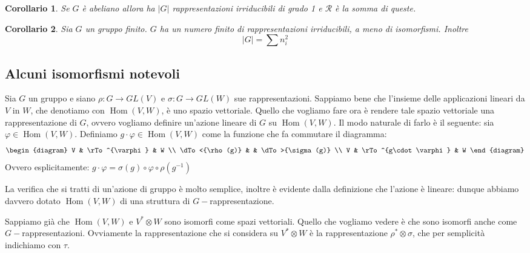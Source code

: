 \documentclass[11pt]{article}
\theoremstyle{plain}
\newtheorem*{cor}{Corollario}
\theoremstyle{definition}
\theoremstyle{remark}
\newcommand{\dsum}{\displaystyle\sum}
\DeclareMathOperator{\Hom}{Hom}
\newcommand{\quaddiag}[8]{
	\begin{diagram}
	#1     & \rTo^{#2} & #3 \\
	\dTo<{#6} &         & \dTo>{#4} \\
	#7     & \rTo^{#8} & #5
	\end{diagram}
}
\begin{document}
\begin{cor}
Se $G$ è abeliano allora ha $|G|$ rappresentazioni irriducibili di grado 1 e $\mathcal{R}$ è la somma di queste.
\end{cor}


\begin{cor}
Sia $G$ un gruppo finito. $G$ ha un numero finito di rappresentazioni irriducibili, a meno di isomorfismi. Inoltre
\[|G| = \dsum n_i^2\]
\end{cor}






\newpage
\subsection{Alcuni isomorfismi notevoli}
Sia $G$ un gruppo e siano $\rho:G\to GL(V)$ e $\sigma:G\to GL(W)$ sue rappresentazioni.
Sappiamo bene che l'insieme delle applicazioni lineari da $V$ in $W$,
che denotiamo con $\Hom(V, W)$, è uno spazio vettoriale.
Quello che vogliamo fare ora è rendere tale spazio vettoriale una rappresentazione di $G$,
ovvero vogliamo definire un'azione lineare di $G$ su $\Hom(V, W)$. 
Il modo naturale di farlo è il seguente:
sia $\varphi\in\Hom(V, W)$. Definiamo $g\cdot \varphi\in\Hom(V, W)$ come la funzione che fa commutare il diagramma:
\[ \quaddiag V \varphi W {\sigma(g)} W {\rho(g)} V {g\cdot \varphi} \]
Ovvero esplicitamente: $g\cdot\varphi = \sigma(g) \circ \varphi\circ \rho(g^{-1})$

La verifica che si tratti di un'azione di gruppo è molto semplice, inoltre è evidente dalla definizione che l'azione è lineare:
dunque abbiamo davvero dotato $\Hom(V, W)$ di una struttura di $G-$rappresentazione.

Sappiamo già che $\Hom(V, W)$ e $V^*\otimes W$ sono isomorfi come spazi vettoriali.
Quello che vogliamo vedere è che sono isomorfi anche come $G-$rappresentazioni.
Ovviamente la rappresentazione che si considera su $V^*\otimes W$ è la rappresentazione $\rho^*\otimes\sigma$, che per semplicità indichiamo con $\tau$.
\end{document}
